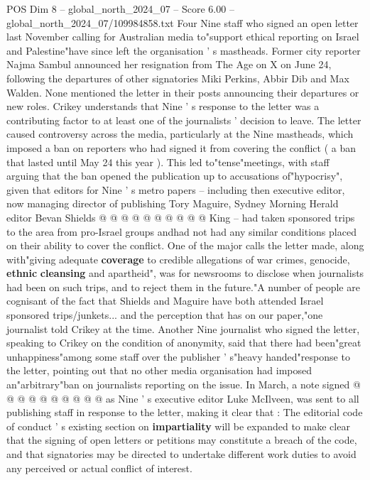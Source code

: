 \begin{textsample}{POS Dim 8 – global\_north\_2024\_07 – Score 6.00 – global\_north\_2024\_07/109984858.txt}  \label{ex:f8_pos_261}
Four Nine staff who signed an open letter last November calling for Australian media to"support ethical reporting on Israel and Palestine"have since left the organisation ' s mastheads.
Former city reporter Najma Sambul announced her resignation from The Age on X on June 24, following the departures of other signatories Miki Perkins, Abbir Dib and Max Walden.
None mentioned the letter in their posts announcing their departures or new roles.
Crikey understands that Nine ' s response to the letter was a contributing factor to at least one of the journalists ' decision to leave.
The letter caused controversy across the media, particularly at the Nine mastheads, which imposed a ban on reporters who had signed it from covering the conflict ( a ban that lasted until May 24 this year ).
This led to"tense"meetings, with staff arguing that the ban opened the publication up to accusations of"hypocrisy", given that editors for Nine ' s metro papers -- including then executive editor, now managing director of publishing Tory Maguire, Sydney Morning Herald editor Bevan Shields @ @ @ @ @ @ @ @ @ @ King -- had taken sponsored trips to the area from pro-Israel groups andhad not had any similar conditions placed on their ability to cover the conflict.
One of the major calls the letter made, along with"giving adequate \textbf{coverage} to credible allegations of war crimes, genocide, \textbf{ethnic} \textbf{cleansing} and apartheid", was for newsrooms to disclose when journalists had been on such trips, and to reject them in the future."A number of people are cognisant of the fact that Shields and Maguire have both attended Israel sponsored trips/junkets... and the perception that has on our paper,"one journalist told Crikey at the time.
Another Nine journalist who signed the letter, speaking to Crikey on the condition of anonymity, said that there had been"great unhappiness"among some staff over the publisher ' s"heavy handed"response to the letter, pointing out that no other media organisation had imposed an"arbitrary"ban on journalists reporting on the issue.
In March, a note signed @ @ @ @ @ @ @ @ @ @ as Nine ' s executive editor Luke McIlveen, was sent to all publishing staff in response to the letter, making it clear that : The editorial code of conduct ' s existing section on \textbf{impartiality} will be expanded to make clear that the signing of open letters or petitions may constitute a breach of the code, and that signatories may be directed to undertake different work duties to avoid any perceived or actual conflict of interest.

\end{textsample}
